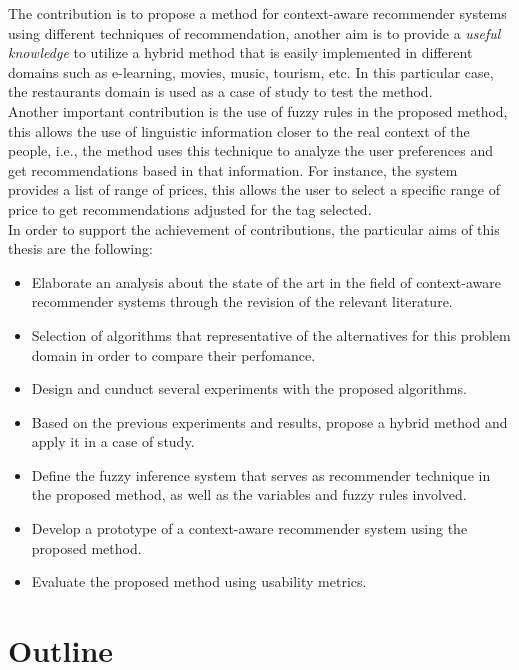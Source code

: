 The contribution is to propose a method for context-aware recommender
systems using different techniques of recommendation, another aim is
to provide a \textit{useful knowledge} to utilize a hybrid method that
is easily implemented in different domains such as e-learning, movies,
music, tourism, etc. In this particular case, the restaurants domain
is used as a case of study to test the method.\\
Another important contribution is the use of fuzzy rules in the
proposed method, this allows the use of linguistic information closer
to the real context of the people, i.e., the method uses this
technique to analyze the user preferences and get recommendations
based in that information. For instance, the system provides a list of
range of prices, this allows the user to select a specific range of
price to get recommendations adjusted for the tag selected.\\ In order
to support the achievement of contributions, the particular aims of
this thesis are the following:
\begin{itemize}  
\item Elaborate an analysis about the state of the art in the field
of context-aware recommender systems through  the revision of the relevant
literature. 
\item Selection of algorithms that representative of the alternatives for
this problem domain in order to compare their perfomance.
\item Design and cunduct several experiments with the proposed algorithms.
\item Based on the previous experiments and results, propose a hybrid
method and apply it in a case of study.
\item Define the fuzzy inference system that serves as recommender
technique in the proposed method, as well as the variables and fuzzy
rules involved.
\item Develop a prototype of a context-aware recommender system 
using the proposed method.
\item Evaluate the proposed method using usability metrics.
\end{itemize} 

\section{Outline}

